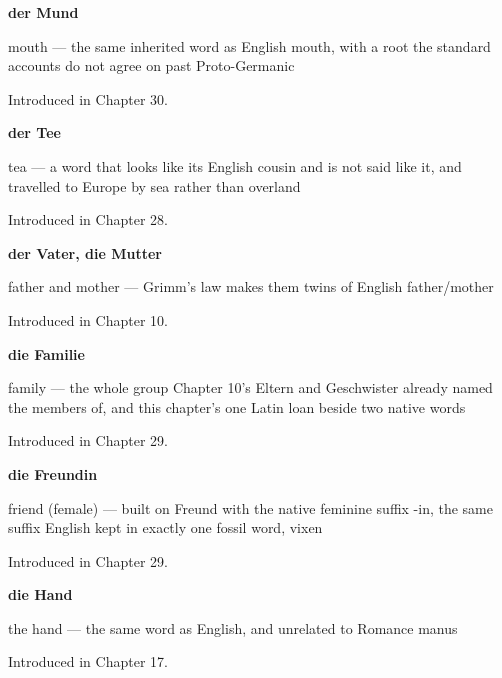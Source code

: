 \noindent\begin{minipage}[t]{\linewidth}
\raggedright
\textbf{der Mund}\par
\small mouth — the same inherited word as English mouth, with a root the standard accounts do not agree on past Proto-Germanic\par
\footnotesize Introduced in Chapter 30.
\end{minipage}\par\medskip

\noindent\begin{minipage}[t]{\linewidth}
\raggedright
\textbf{der Tee}\par
\small tea — a word that looks like its English cousin and is not said like it, and travelled to Europe by sea rather than overland\par
\footnotesize Introduced in Chapter 28.
\end{minipage}\par\medskip

\noindent\begin{minipage}[t]{\linewidth}
\raggedright
\textbf{der Vater, die Mutter}\par
\small father and mother — Grimm's law makes them twins of English father/mother\par
\footnotesize Introduced in Chapter 10.
\end{minipage}\par\medskip

\noindent\begin{minipage}[t]{\linewidth}
\raggedright
\textbf{die Familie}\par
\small family — the whole group Chapter 10's Eltern and Geschwister already named the members of, and this chapter's one Latin loan beside two native words\par
\footnotesize Introduced in Chapter 29.
\end{minipage}\par\medskip

\noindent\begin{minipage}[t]{\linewidth}
\raggedright
\textbf{die Freundin}\par
\small friend (female) — built on Freund with the native feminine suffix -in, the same suffix English kept in exactly one fossil word, vixen\par
\footnotesize Introduced in Chapter 29.
\end{minipage}\par\medskip

\noindent\begin{minipage}[t]{\linewidth}
\raggedright
\textbf{die Hand}\par
\small the hand — the same word as English, and unrelated to Romance manus\par
\footnotesize Introduced in Chapter 17.
\end{minipage}\par\medskip


